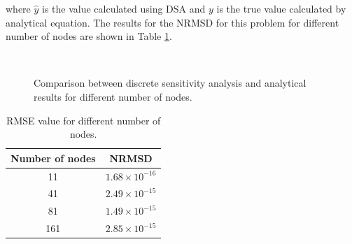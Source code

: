 where $\hat{y}$ is the value calculated using DSA and $y$ is the true value calculated by analytical equation. The results for the NRMSD for this problem for different number of nodes are shown in Table \ref{table:C2_DSA_NRMSD}.

\begin{figure}[H]
	\centering
	\quad
	\\
	\quad
	\caption{Comparison between discrete sensitivity analysis and analytical results for different number of nodes.}
	\label{fig:C2_discreteSensitivityVerification}
\end{figure}

\begin{table}[H]
\centering
\begin{tabular}{| c | c |}
	\hline
	Number of nodes & NRMSD \\ \hline \hline
	11 & $1.68 \times 10^{-16}$ \\ \hline
	41 & $2.49 \times 10^{-15}$ \\ \hline
	81 & $1.49 \times 10^{-15}$ \\ \hline
	161 & $2.85 \times 10^{-15}$ \\ \hline
\end{tabular}
\caption{RMSE value for different number of nodes.}
\label{table:C2_DSA_NRMSD}
\end{table}

